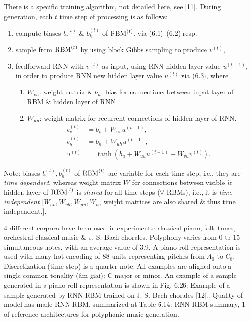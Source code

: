 \documentclass{article}
\begin{document}
\begin{itemize}
\begin{itemize}
\begin{itemize}
\begin{itemize}
\begin{enumerate}
				\end{enumerate}
				There is a specific training algorithm, not detailed here, see [11]. During generation, each $t$ time step of processing is as follows:
				\begin{enumerate}
					\item compute biases $b_v^{(t)}$ \& $b_h^{(t)}$ of ${\rm RBM}^{(t)}$, via (6.1)--(6.2) resp.
					\item sample from ${\rm RBM}^{(t)}$ by using block Gibbs sampling to produce $v^{(t)}$,
					\item feedforward RNN with $v^{(t)}$ as input, using RNN hidden layer value $u^{(t-1)}$, in order to produce RNN new hidden layer value $u^{(t)}$ via (6.3), where
					\begin{enumerate}
						\item $W_{vu}$: weight matrix \& $b_u$: bias for connections between input layer of RBM \& hidden layer of RNN
						\item $W_{uu}$: weight matrix for recurrent connections of hidden layer of RNN.
						\begin{align*}
							b_v^{(t)} &= b_v + W_{uv}u^{(t-1)},\\
							b_h^{(t)} &= b_h + W_{uh}u^{(t-1)},\\
							u^{(t)} &= \tanh(b_u + W_{uu}u^{(t-1)} + W_{vu}v^{(t)}).
						\end{align*}
					\end{enumerate}
				\end{enumerate}
				Note: biases $b_v^{(t)},b_h^{(t)}$ of ${\rm RBM}^{(t)}$ are variable for each time step, i.e., they are {\it time dependent}, whereas weight matrix $W$ for connections between visible \& hidden layer of ${\rm RBM}^{(t)}$ is {\it shared} for all time steps ($\forall$ RBMs), i.e., it is {\it time independent} [$W_{uv},W_{uh},W_{uu},W_{vu}$ weight matrices are also shared \& thus time independent.].

				4 different corpora have been used in experiments: classical piano, folk tunes, orchestral classical music \& {\sc J. S. Bach} chorales. Polyphony varies from 0 to 15 simultaneous notes, with an average value of 3.9. A piano roll representation is used with many-hot encoding of 88 units representing pitches from $A_0$ to $C_8$. Discretization (time step) is a quarter note. All examples are aligned onto a single common tonality (âm giai): C major or minor. An example of a sample generated in a piano roll representation is shown in {\sf Fig. 6.26: Example of a sample generated by RNN-RBM trained on {\sc J. S. Bach} chorales [12].}. Quality of model has made RNN-RBM, summarized at {\sf Table 6.14: RNN-RBM summary}, 1 of reference architectures for polyphonic music generation.


\end{itemize}
\end{itemize}
\end{itemize}
\end{itemize}
\end{document}
